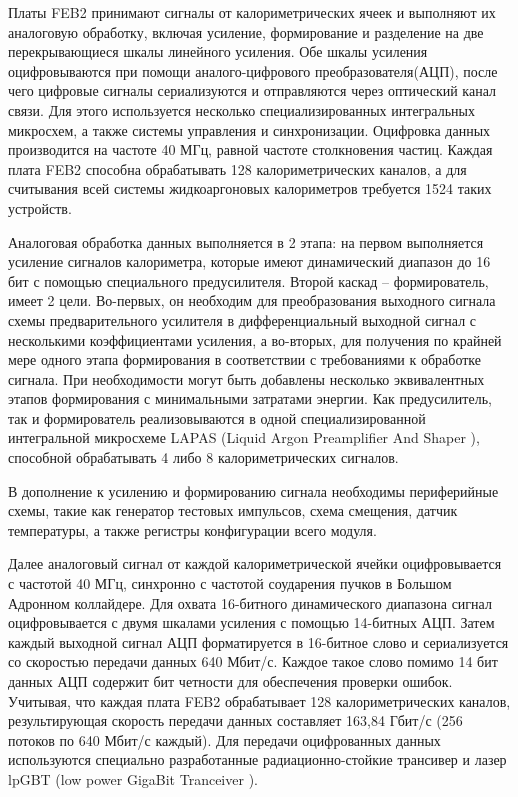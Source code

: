 Платы FEB2 принимают сигналы от калориметрических ячеек и выполняют их аналоговую обработку, включая усиление, формирование и разделение на две перекрывающиеся шкалы линейного усиления. Обе шкалы усиления оцифровываются при помощи аналого-цифрового преобразователя(АЦП), после чего цифровые сигналы сериализуются и отправляются через оптический канал связи. Для этого используется несколько специализированных интегральных микросхем, а также системы управления и синхронизации. Оцифровка данных производится на частоте 40 МГц, равной частоте столкновения частиц. Каждая плата FEB2 способна обрабатывать 128 калориметрических каналов, а для считывания всей системы жидкоаргоновых калориметров требуется 1524 таких устройств.\par
Аналоговая обработка данных выполняется в 2 этапа: на первом выполняется усиление сигналов калориметра, которые имеют динамический диапазон до 16 бит с помощью специального предусилителя. Второй каскад -- формирователь, имеет 2 цели. Во-первых, он необходим для преобразования выходного сигнала схемы предварительного усилителя в дифференциальный выходной сигнал с несколькими коэффициентами усиления, а во-вторых, для получения по крайней мере одного этапа формирования в соответствии с требованиями к обработке сигнала. При необходимости могут быть добавлены несколько эквивалентных этапов формирования с минимальными затратами энергии. Как предусилитель, так и формирователь реализовываются в одной специализированной интегральной микросхеме LAPAS (Liquid Argon Preamplifier And Shaper \parencite{lapas}), способной обрабатывать 4 либо 8 калориметрических сигналов.\par
В дополнение к усилению и формированию сигнала необходимы периферийные схемы, такие как генератор тестовых импульсов, схема смещения, датчик температуры, а также регистры конфигурации всего модуля.\par
Далее аналоговый сигнал от каждой калориметрической ячейки оцифровывается с частотой 40 МГц, синхронно с частотой соударения пучков в Большом Адронном коллайдере. Для охвата 16-битного динамического диапазона сигнал оцифровывается с двумя шкалами усиления с помощью 14-битных АЦП. Затем каждый выходной сигнал АЦП форматируется в 16-битное слово и сериализуется со скоростью передачи данных 640 Мбит/с. Каждое такое слово помимо 14 бит данных АЦП содержит бит четности для обеспечения проверки ошибок. Учитывая, что каждая плата FEB2 обрабатывает 128 калориметрических каналов, результирующая скорость передачи данных составляет 163,84 Гбит/с (256 потоков по 640 Мбит/с каждый). Для передачи оцифрованных данных используются специально разработанные радиационно-стойкие трансивер и лазер lpGBT (low power GigaBit Tranceiver \parencite{lpgbt}). \par
